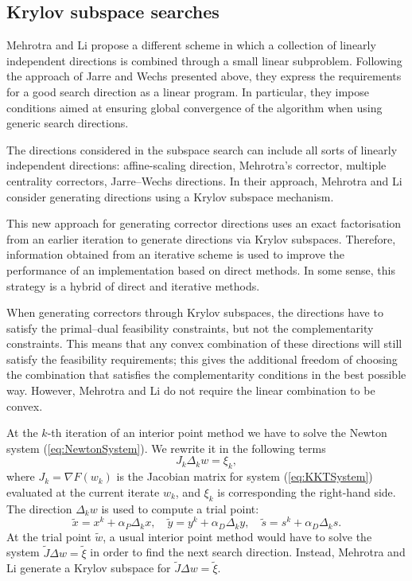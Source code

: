 %
%
\subsection{Krylov subspace searches}

Mehrotra and Li \cite{MehrotraLi} propose a different 
scheme in which a collection of linearly 
independent directions is combined through a small linear subproblem.
Following the approach of Jarre and Wechs \cite{JarreWechs}
presented above,
they express the requirements for a good search direction as a linear 
program. In particular, they impose conditions aimed at ensuring 
global convergence of the algorithm when using generic search directions.

The directions considered in the subspace search can include all 
sorts of linearly independent directions: affine-scaling direction, 
Mehrotra's corrector, multiple centrality correctors, Jarre--Wechs 
directions. 
In their approach, Mehrotra and Li \cite{MehrotraLi}
consider generating directions using a Krylov subspace mechanism.

This new approach for generating corrector directions uses an exact 
factorisation from an earlier iteration to generate directions 
via Krylov subspaces. 
Therefore, information obtained from an iterative scheme is used 
to improve the performance of an implementation based on direct 
methods. In some sense, this strategy is a hybrid of direct 
and iterative methods.

When generating correctors through Krylov subspaces, the directions 
have to satisfy the primal--dual feasibility constraints, but not 
the complementarity constraints. This means that any convex combination 
of these directions will still satisfy the feasibility requirements; 
this gives the additional freedom of choosing the combination that 
satisfies the complementarity conditions in the best possible way. 
However, Mehrotra and Li \cite{MehrotraLi} do not require 
the linear combination to be convex.

At the $k$-th iteration of an interior point method we have to solve 
the Newton system (\ref{eq:NewtonSystem}).
We rewrite it in the following terms
\[
   J_k \Delta_k w = \xi_k, 
\]
where 
$J_k = \nabla F(w_k)$ is the Jacobian matrix for system
(\ref{eq:KKTSystem}) evaluated at the current iterate $w_k$,
and $\xi_k$ is corresponding the right-hand side.
%
The direction $\Delta_k w$ is used to compute a trial point:
\[
\tilde{x} = x^k + \alpha_P \Delta_k x, \quad
\tilde{y} = y^k + \alpha_D \Delta_k y, \quad
\tilde{s} = s^k + \alpha_D \Delta_k s.
\]
%
At the trial point $\tilde w$, a usual 
interior point method would have to solve the system
$\tilde J \Delta w = \tilde \xi$
in order to find the next search direction. Instead, 
Mehrotra and Li \cite{MehrotraLi} generate a Krylov subspace 
for $\tilde J \Delta w = \tilde \xi$.

